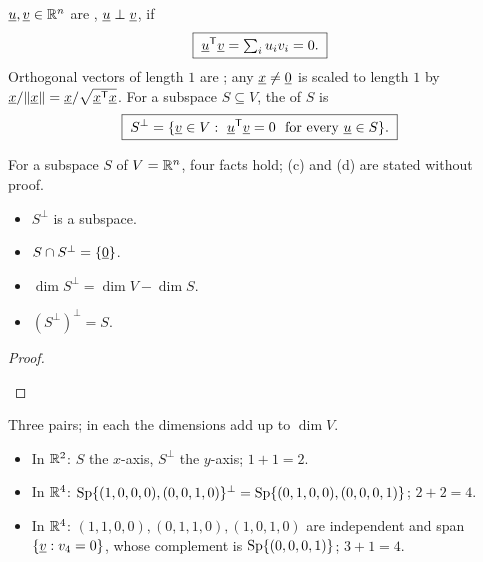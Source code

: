 \begin{definition}
$\underline{u},\underline{v}\in\mathbb{R}^n$ are , $\underline{u}\perp\underline{v}$, if
\[
  \boxed{\;\underline{u}^{\mathsf{T}}\underline{v}=\textstyle\sum_iu_iv_i=0.\;}
\]
Orthogonal vectors of length $1$ are ; any $\underline{x}\ne\underline{0}$ is scaled to length $1$ by $\underline{x}/\|\underline{x}\|=\underline{x}/\sqrt{\underline{x}^{\mathsf{T}}\underline{x}}$. For a subspace $S\subseteq V$, the  of $S$ is
\[
  \boxed{\;S^\perp=\{\vect{v}\in V:\ \vect{u}\T\vect{v}=0\ \text{ for every }\vect{u}\in S\}.\;}
\]
\end{definition}

\begin{result}
For a subspace $S$ of $V=\mathbb{R}^n$, four facts hold; (c) and (d) are stated without proof.
\begin{itemize}
  \item[(a)] $S^\perp$ is a subspace.
  \item[(b)] $S\cap S^\perp=\{\underline{0}\}$.
  \item[(c)] $\dim S^\perp=\dim V-\dim S$.
  \item[(d)] $(S^\perp)^\perp=S$.
\end{itemize}
\end{result}
\begin{proof}
\begin{deriv}
\end{deriv}
\end{proof}

\begin{example}[Complements]
Three pairs; in each the dimensions add up to $\dim V$.
\begin{itemize}
  \item In $\mathbb{R}^2$: $S$ the $x$-axis, $S^\perp$ the $y$-axis; $1+1=2$.
  \item In $\mathbb{R}^4$: $\operatorname{Sp}\{(1,0,0,0),(0,0,1,0)\}^\perp=\operatorname{Sp}\{(0,1,0,0),(0,0,0,1)\}$; $2+2=4$.
  \item In $\mathbb{R}^4$: $(1,1,0,0),(0,1,1,0),(1,0,1,0)$ are independent and span $\{\underline{v}:v_4=0\}$, whose complement is $\operatorname{Sp}\{(0,0,0,1)\}$; $3+1=4$.
\end{itemize}
\end{example}

